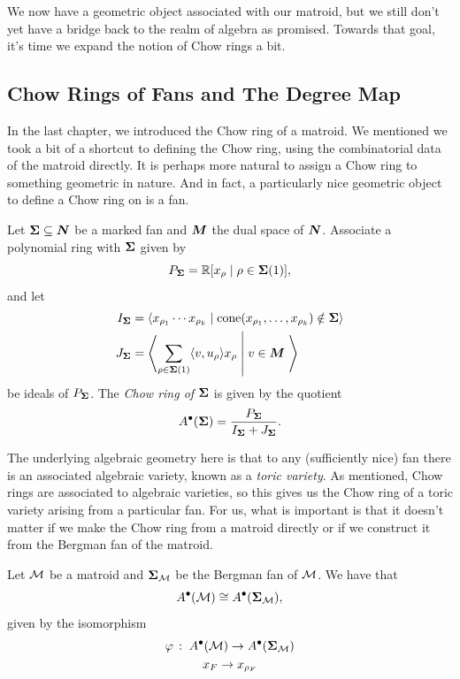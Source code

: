 \documentclass[12pt,oneside]{../../sfsuthesis}
\begin{document}
We now have a geometric object associated with our matroid, but we still don't yet have a bridge back to the realm of algebra as promised.
Towards that goal, it's time we expand the notion of Chow rings a bit.

\subsection{Chow Rings of Fans and The Degree Map}

In the last chapter, we introduced the Chow ring of a matroid.
We mentioned we took a bit of a shortcut to defining the Chow ring, using the combinatorial data of the matroid directly.
It is perhaps more natural to assign a Chow ring to something geometric in nature.
And in fact, a particularly nice geometric object to define a Chow ring on is a fan.
\begin{definition}\th\label{def:ChowRingFan}
    Let \( {\bm{\Sigma}} \subseteq \bm{N} \) be a marked fan and \( \bm{M} \) the dual space of \( \bm{N} \).
    Associate a polynomial ring with \( {\bm{\Sigma}} \) given by
    \[
        P_{\bm{\Sigma}} = \mathbb{R} [ x_\rho \; | \; \rho \in {\bm{\Sigma}}(1) ],
    \]
    and let
    \begin{align*}
        I_{\bm{\Sigma}} & = \langle x_{\rho_1} \cdots x_{\rho_k} \; | \; \mathrm{cone}(x_{\rho_1}, \dots, x_{\rho_k}) \notin {\bm{\Sigma}} \rangle            \\
        J_{\bm{\Sigma}} & = \left\langle \sum_{\rho \in {\bm{\Sigma}}(1)} \langle v, u_\rho \rangle x_\rho \; \middle| \; v \in \bm{M}  \; \right\rangle
    \end{align*}
    be ideals of \( P_{\bm{\Sigma}} \).
    The \emph{Chow ring of \( {\bm{\Sigma}} \)} is given by the quotient
    \[
        A^\bullet({\bm{\Sigma}}) = \frac{P_{\bm{\Sigma}}}{I_{\bm{\Sigma}} + J_{\bm{\Sigma}}}.
    \]
\end{definition}
The underlying algebraic geometry here is that to any (sufficiently nice) fan there is an associated algebraic variety, known as a \emph{toric variety}.
As mentioned, Chow rings are associated to algebraic varieties, so this gives us the Chow ring of a toric variety arising from a particular fan.
For us, what is important is that it doesn't matter if we make the Chow ring from a matroid directly or if we construct it from the Bergman fan of the matroid.
\begin{proposition}\th\label{thm:chowRingIso}
    Let \( \mathcal{M} \) be a matroid and \( {\bm{\Sigma}}_{\mathcal{M}} \) be the Bergman fan of \( \mathcal{M} \).
    We have that
    \[
        A^\bullet(\mathcal{M}) \cong A^\bullet({\bm{\Sigma}}_{\mathcal{M}}),
    \]
    given by the isomorphism
    \begin{gather*}
        \varphi \,:\; A^\bullet(\mathcal{M}) \to A^\bullet({\bm{\Sigma}}_{\mathcal{M}}) \\
        x_F \to x_{\rho_F}
    \end{gather*}
\end{proposition}
\end{document}
